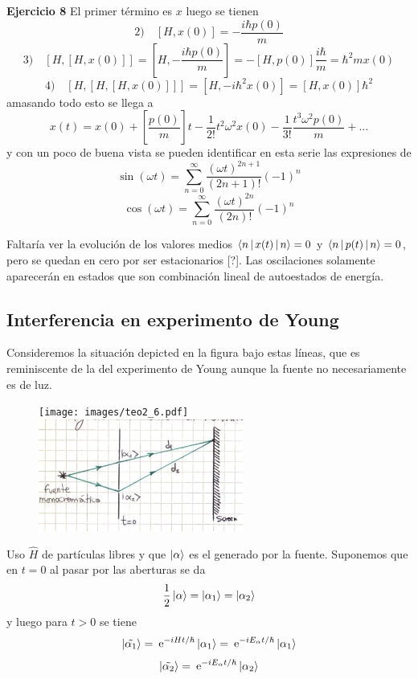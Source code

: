 \documentclass[10pt,oneside]{CBFT_book}
\begin{document}
\begin{ejemplo}{\bf Ejercicio 8}
El primer término es $x$ luego se tienen
\[
	2) \quad [H, x(0)] = - \frac{ i \hbar p(0) }{ m }
\]
\[
	3) \quad [ H, [ H, x(0) ] ] = [ H, -\frac{i \hbar p(0)}{m} ] =
	-[H,p(0)]\frac{i\hbar}{m} = \hbar^2 m x(0)
\]
\[
	4) \quad [ H, [ H, [ H,x(0)] ] ] = [ H, -i \hbar^2 x(0) ] = [ H, x(0) ] \hbar^2
\]
amasando todo esto se llega a
\[
	x(t) = x(0) + \left[ \frac{p(0)}{m} \right] t - \frac{1}{2!}t^2\omega^2 x(0) -
	\frac{1}{3!} \frac{t^3\omega^2 p(0)}{m} + ...
\]
y con un poco de buena vista se pueden identificar en esta serie las expresiones de 
\[
	\sin(\omega t) = \sum_{n=0}^\infty \frac{(\omega t)^{2n+1}}{(2n+1)!} (-1)^n
\]
\[
	\cos(\omega t) = \sum_{n=0}^\infty \frac{(\omega t)^{2n}}{(2n)!} (-1)^n
\]
 
Faltaría ver la evolución de los valores medios $\Braket{n|x(t)|n}=0$ y 
$\Braket{n|p(t)|n} = 0 $, pero se quedan en cero por ser estacionarios [?].
Las oscilaciones solamente aparecerán en estados que son combinación lineal de autoestados
de energía.
 
\end{ejemplo}


\subsection{Interferencia en experimento de Young}

Consideremos la situación depicted en la figura bajo estas líneas, que es reminiscente de la del
experimento de Young aunque la fuente no necesariamente es de luz.

\begin{figure}[h]
	\begin{center}
	\texttt{[image: images/teo2\_6.pdf]}
	\includegraphics[width=0.6\textwidth]{images/fig_ft2_young_analogous.jpg}
	\end{center}
	\caption{}
\end{figure} 

Uso $\hat{H}$ de partículas libres y que $\Ket{\alpha}$ es el generado por la fuente.
Suponemos que en $t=0$ al pasar por las aberturas se da
\[
	\frac{1}{2} \Ket{\alpha} = \Ket{\alpha_1} = \Ket{\alpha_2}
\]
y luego para $t>0$ se tiene 
\[
	\Ket{\tilde{\alpha_1}} = \:\mathrm{e}^{ -i H t /\hbar } \Ket{\alpha_1} =
		\:\mathrm{e}^{ -i E_\alpha t /\hbar } \Ket{\alpha_1}	
\]
\[
	\Ket{\tilde{\alpha_2}} = \:\mathrm{e}^{ -i E_\alpha t /\hbar } \Ket{\alpha_2}	
\]
\end{document}
